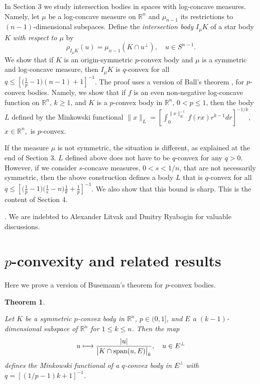 \documentclass[12pt]{amsart} %
\newtheorem{theorem}{Theorem}
\renewcommand{\[}{\left[}
\renewcommand{\(}{\left(}
\renewcommand{\]}{\right]}
\renewcommand{\)}{\right)}
\renewcommand{\le}{\leqslant}
\renewcommand{\ge}{\geqslant}
\newcommand{\R}{\mathbb R}              %
\begin{document}
In Section 3 we study  intersection bodies in  spaces with log-concave measures. Namely, let $\mu$ be a log-concave measure on $\mathbb R^n$ and $\mu_{n-1}$ its restrictions to $(n-1)$-dimensional subspaces.  Define the {\em intersection body} $I_\mu K$ of a star body $K$ {\em with respect to $\mu$} by
$$
\rho_{I_\mu K}(u) = \mu_{n-1}(K\cap u^\bot),\quad u \in S^{n-1}.
$$
We show that if $K$ is an origin-symmetric $p$-convex body  and   $\mu$ is a symmetric and log-concave measure, then $I_\mu K$ is $q$-convex for all $q \le \left[
\big(\frac 1p-1\big)(n-1) + 1 \right]^{-1}$. The proof uses a version of Ball's theorem \cite{Ba1}, \cite{Ba2} for $p$-convex bodies. Namely, we show that if $f$ is an even non-negative log-concave function on $\mathbb R^n$, $k\ge 1$, and $K$  is a $p$-convex body in $\R^n$, $0<p\le 1$, then the body $L$ defined by the Minkowski functional
$
\|x\|_L = \left[\int_0^{\|x\|_K^{-1}} f(rx)r^{k-1}dr \right]^{-1/k}, $ $x\in\R^n, $
is $p$-convex.

If the measure $\mu$ is not symmetric, the situation is different, as explained at the end of Section 3.  $L$ defined above does not have to be $q$-convex for any $q>0$. However, if we consider $s$-concave measures,  $0<s<1/n$, that are not necessarily symmetric, then the above construction defines a body $L$ that is $q$-convex for all $q\le \[\big(\frac 1p-1\big)\big(\frac 1s-n\big)\frac 1k + \frac 1p\]^{-1}$. We also show that this bound is sharp. This is the content of Section 4.


. We are indebted to Alexander Litvak and Dmitry Ryabogin for
valuable discussions.



\section{$p$-convexity and related results}


Here we prove  a version of Busemann's theorem for $p$-convex bodies. %

\begin{theorem}\label{th:pbus}


Let $K$ be a symmetric $p$-convex body in $\R^n$,   $p \in (0,1]$, and $E$ a $(k-1)$-dimensional subspace of $\R^n$ for $1\le k\le n$. Then the map
$$
u \longmapsto \frac{|u|}{\big|K \cap {\rm span}(u,E)\big|_k},\quad u\in E^\perp
$$
defines the Minkowski functional of a $q$-convex body in $E^\bot$ with $q =\left[
\left(1/p-1\right)k + 1 \right]^{-1}$.
\end{theorem}
\end{document}
